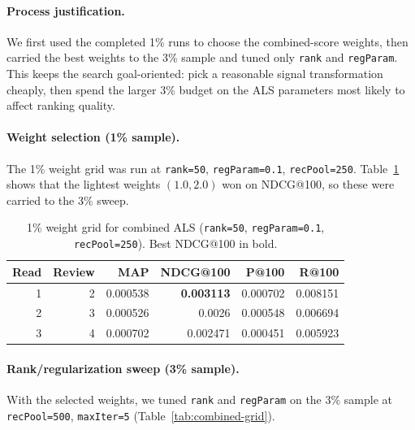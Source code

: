 \documentclass[10pt,twocolumn]{article}
\begin{document}
\paragraph{Process justification.} We first used the completed 1\% runs to choose the combined-score weights, then carried the best weights to the 3\% sample and tuned only \texttt{rank} and \texttt{regParam}. This keeps the search goal-oriented: pick a reasonable signal transformation cheaply, then spend the larger 3\% budget on the ALS parameters most likely to affect ranking quality.

\paragraph{Weight selection (1\% sample).} The 1\% weight grid was run at \texttt{rank=50}, \texttt{regParam=0.1}, \texttt{recPool=250}. Table~\ref{tab:combined-weights} shows that the lightest weights $(1.0, 2.0)$ won on NDCG@100, so these were carried to the 3\% sweep.

\begin{table}[!ht]
\centering
\caption{1\% weight grid for combined ALS (\texttt{rank=50}, \texttt{regParam=0.1}, \texttt{recPool=250}). Best NDCG@100 in bold.}
\label{tab:combined-weights}
\footnotesize
\setlength{\tabcolsep}{3pt}
\begin{tabular}{r r r r r r}
\toprule
\textbf{Read} & \textbf{Review} & \textbf{MAP} & \textbf{NDCG@100} & \textbf{P@100} & \textbf{R@100} \\
\midrule
1 & 2 & 0.000538 & \textbf{0.003113} & 0.000702 & 0.008151 \\
2 & 3 & 0.000526 & 0.0026          & 0.000548 & 0.006694 \\
3 & 4 & 0.000702 & 0.002471          & 0.000451 & 0.005923 \\
\bottomrule
\end{tabular}
\end{table}

\paragraph{Rank/regularization sweep (3\% sample).} With the selected weights, we tuned \texttt{rank} and \texttt{regParam} on the 3\% sample at \texttt{recPool=500}, \texttt{maxIter=5} (Table~\ref{tab:combined-grid}).
\end{document}
